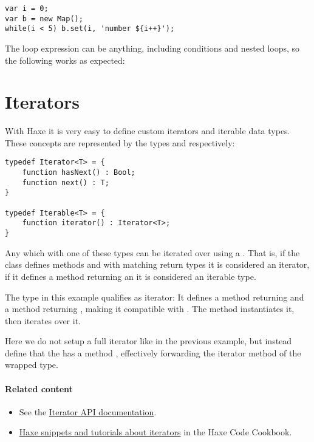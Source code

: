 \begin{lstlisting}
var i = 0;
var b = new Map();
while(i < 5) b.set(i, 'number ${i++}');
\end{lstlisting}

The loop expression can be anything, including conditions and nested loops, so the following works as expected:



\section{Iterators}
\label{lf-iterators}

With Haxe it is very easy to define custom iterators and iterable data types. These concepts are represented by the types  and  respectively:

\begin{lstlisting}
typedef Iterator<T> = {
	function hasNext() : Bool;
	function next() : T;
}

typedef Iterable<T> = {
	function iterator() : Iterator<T>;
}
\end{lstlisting}

Any  which  with one of these types can be iterated over using a . That is, if the class defines methods  and  with matching return types it is considered an iterator, if it defines a method  returning an  it is considered an iterable type.


The type  in this example qualifies as iterator: It defines a method  returning  and a method  returning , making it compatible with . The  method instantiates it, then iterates over it.


Here we do not setup a full iterator like in the previous example, but instead define that the  has a method , effectively forwarding the iterator method of the wrapped  type.

\paragraph{Related content}
\begin{itemize}
	\item See the \href{http://api.haxe.org/Iterator.html}{Iterator API documentation}.
	\item \href{http://code.haxe.org/tag/iterator.html}{Haxe snippets and tutorials about iterators} in the Haxe Code Cookbook.
\end{itemize}


